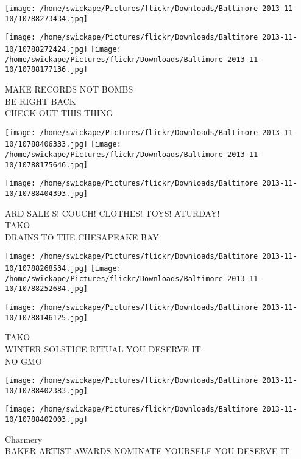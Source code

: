 \documentclass[10pt,letterpaper]{article}
\begin{document}
\texttt{[image: /home/swickape/Pictures/flickr/Downloads/Baltimore 2013-11-10/10788273434.jpg]}

\vspace{0.25in}
\texttt{[image: /home/swickape/Pictures/flickr/Downloads/Baltimore 2013-11-10/10788272424.jpg]}
\texttt{[image: /home/swickape/Pictures/flickr/Downloads/Baltimore 2013-11-10/10788177136.jpg]}

MAKE RECORDS NOT BOMBS\\
BE RIGHT BACK\\
CHECK OUT THIS THING\\
\pagebreak

\texttt{[image: /home/swickape/Pictures/flickr/Downloads/Baltimore 2013-11-10/10788406333.jpg]}
\texttt{[image: /home/swickape/Pictures/flickr/Downloads/Baltimore 2013-11-10/10788175646.jpg]}

\vspace{0.25in}
\texttt{[image: /home/swickape/Pictures/flickr/Downloads/Baltimore 2013-11-10/10788404393.jpg]}

ARD SALE S! COUCH! CLOTHES! TOYS! ATURDAY!\\
TAKO\\
DRAINS TO THE CHESAPEAKE BAY\\
\pagebreak

\texttt{[image: /home/swickape/Pictures/flickr/Downloads/Baltimore 2013-11-10/10788268534.jpg]}
\texttt{[image: /home/swickape/Pictures/flickr/Downloads/Baltimore 2013-11-10/10788252684.jpg]}

\texttt{[image: /home/swickape/Pictures/flickr/Downloads/Baltimore 2013-11-10/10788146125.jpg]}

TAKO\\
WINTER SOLSTICE RITUAL YOU DESERVE IT\\
NO GMO\\
\pagebreak

\texttt{[image: /home/swickape/Pictures/flickr/Downloads/Baltimore 2013-11-10/10788402383.jpg]}

\vspace{0.25in}
\texttt{[image: /home/swickape/Pictures/flickr/Downloads/Baltimore 2013-11-10/10788402003.jpg]}

Charmery\\
BAKER ARTIST AWARDS NOMINATE YOURSELF YOU DESERVE IT\\
\pagebreak
\end{document}
